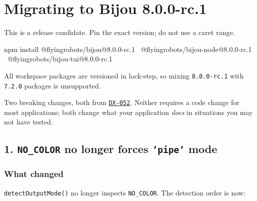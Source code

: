 \chapter{Migrating to Bijou 8.0.0-rc.1}\label{record-273}

\smallskip

This is a release candidate. Pin the exact version; do not use a caret range.

\begin{CodeBlock}
npm install @flyingrobots/bijou@8.0.0-rc.1 \
            @flyingrobots/bijou-node@8.0.0-rc.1 \
            @flyingrobots/bijou-tui@8.0.0-rc.1
\end{CodeBlock}

All workspace packages are versioned in lock-step, so mixing \texttt{8\allowbreak{}.\allowbreak{}0\allowbreak{}.\allowbreak{}0\allowbreak{}-\allowbreak{}r\allowbreak{}c\allowbreak{}.\allowbreak{}1} with \texttt{7\allowbreak{}.\allowbreak{}2\allowbreak{}.\allowbreak{}0} packages is unsupported.

Two breaking changes, both from \href{https://github.com/flyingrobots/bijou/blob/cbd70612140e7a450d764b3c7be1c6af878b99bc/docs/design/DX-052-no-color-is-not-a-capability.md}{\texttt{D\allowbreak{}X\allowbreak{}-\allowbreak{}0\allowbreak{}5\allowbreak{}2}}. Neither requires a code change for most applications; both change what your application \emph{does} in situations you may not have tested.

\section{\texorpdfstring{1. \texttt{N\allowbreak{}O\allowbreak{}\_\allowbreak{}C\allowbreak{}O\allowbreak{}L\allowbreak{}O\allowbreak{}R} no longer forces \texttt{'\allowbreak{}p\allowbreak{}i\allowbreak{}p\allowbreak{}e\allowbreak{}'} mode}{1.  no longer forces  mode}}\label{record-273-no_color-no-longer-forces-pipe-mode}

\subsection{What changed}\label{record-273-what-changed}

\texttt{d\allowbreak{}e\allowbreak{}t\allowbreak{}e\allowbreak{}c\allowbreak{}t\allowbreak{}O\allowbreak{}u\allowbreak{}t\allowbreak{}p\allowbreak{}u\allowbreak{}t\allowbreak{}M\allowbreak{}o\allowbreak{}d\allowbreak{}e\allowbreak{}(\allowbreak{})} no longer inspects \texttt{N\allowbreak{}O\allowbreak{}\_\allowbreak{}C\allowbreak{}O\allowbreak{}L\allowbreak{}O\allowbreak{}R}. The detection order is now:

